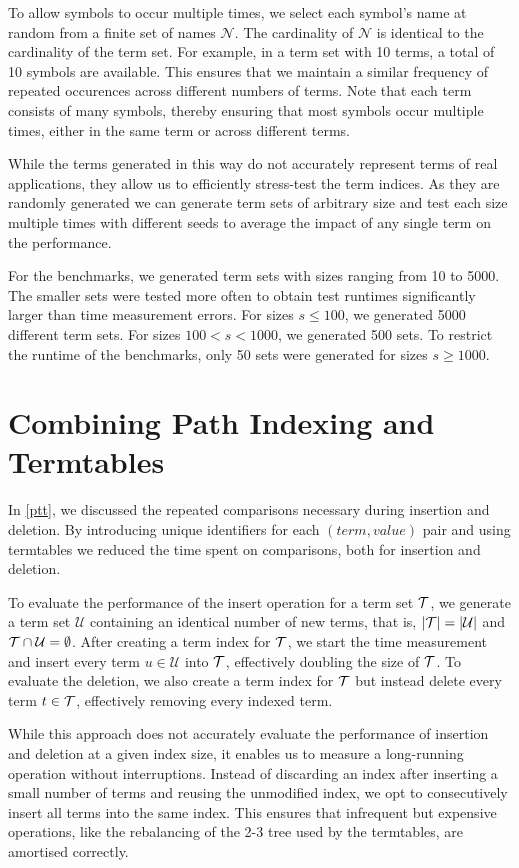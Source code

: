To allow symbols to occur multiple times, we select each symbol's name at random from a finite set of names $\mathcal{N}$.
The cardinality of $\mathcal{N}$ is identical to the cardinality of the term set. For example, in a term set with 10 terms, a total of 10 symbols are available.
This ensures that we maintain a similar frequency of repeated occurences across different numbers of terms.
Note that each term consists of many symbols, thereby ensuring that most symbols occur multiple times, either in the same term or across different terms.

While the terms generated in this way do not accurately represent terms of real applications, they allow us to efficiently stress-test the term indices. As they are randomly generated we can generate term sets of arbitrary size and test each size multiple times with different seeds to average the impact of any single term on the performance.

For the benchmarks, we generated term sets with sizes ranging from 10 to 5000. The smaller sets were tested more often to obtain test runtimes significantly larger than time measurement errors. For sizes $s \leq 100$, we generated 5000 different term sets. For sizes $100 < s < 1000$, we generated 500 sets. To restrict the runtime of the benchmarks, only 50 sets were generated for sizes $s \geq 1000$.

\section{Combining Path Indexing and Termtables} \label{pathindex_termtab}
In \cref{ptt}, we discussed the repeated comparisons necessary during insertion and deletion. By introducing unique identifiers for each $(term,value)$ pair and using termtables we reduced the time spent on comparisons, both for insertion and deletion.

To evaluate the performance of the insert operation for a term set $\mathcal{T}$, we generate a term set $\mathcal{U}$ containing an identical number of new terms, that is, $|\mathcal{T}| = |\mathcal{U}|$ and $\mathcal{T} \cap \mathcal{U} = \emptyset$. After creating a term index for $\mathcal{T}$, we start the time measurement and insert every term $u \in \mathcal{U}$ into $\mathcal{T}$, effectively doubling the size of $\mathcal{T}$. To evaluate the deletion, we also create a term index for $\mathcal{T}$ but instead delete every term $t \in \mathcal{T}$, effectively removing every indexed term.

While this approach does not accurately evaluate the performance of insertion and deletion at a given index size, it enables us to measure a long-running operation without interruptions. Instead of discarding an index after inserting a small number of terms and reusing the unmodified index, we opt to consecutively insert all terms into the same index. This ensures that infrequent but expensive operations, like the rebalancing of the 2-3 tree used by the termtables, are amortised correctly.

